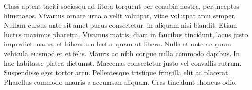 Class aptent taciti sociosqu ad litora torquent per conubia nostra, per inceptos himenaeos. Vivamus ornare urna a velit volutpat, vitae volutpat arcu semper. Nullam cursus ante sit amet purus consectetur, in aliquam nisi blandit. Etiam luctus maximus pharetra. Vivamus mattis, diam in faucibus tincidunt, lacus justo imperdiet massa, et bibendum lectus quam ut libero. Nulla et ante ac quam vehicula euismod et et felis. Mauris ac nibh congue nulla commodo dapibus. In hac habitasse platea dictumst. Maecenas consectetur justo vel convallis rutrum. Suspendisse eget tortor arcu. Pellentesque tristique fringilla elit ac placerat. Phasellus commodo mauris a accumsan aliquam. Cras tincidunt rhoncus odio. 

